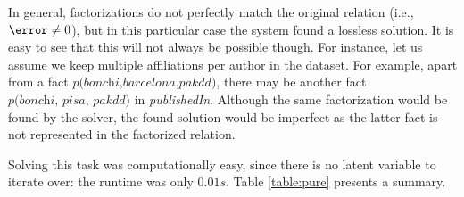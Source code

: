 In general, factorizations do not perfectly match the original relation (i.e., $\error \neq 0$), but in this particular case the system found a lossless solution. It is easy to see that this will not always be possible though. For instance, let us assume we keep multiple affiliations per author in the dataset. For example, apart from a fact $\textit{p(bonchi,barcelona,pakdd)}$, there may be another fact $\textit{p(bonchi, pisa, pakdd)}$ in \textit{publishedIn}. Although the same factorization would be found by the solver, the found solution would be imperfect as the latter fact is not represented in the factorized relation.

Solving this task was computationally easy, since there is no latent variable to iterate over: the runtime was only $0.01s$. Table \ref{table:pure} presents a summary.
\begin{table}[tbh]
\begin{center}
\caption{Experimental summary for pure relational factorizations from Subsection \ref{subsection:beoynd}}
\label{table:pure}
\end{center}
\end{table}

